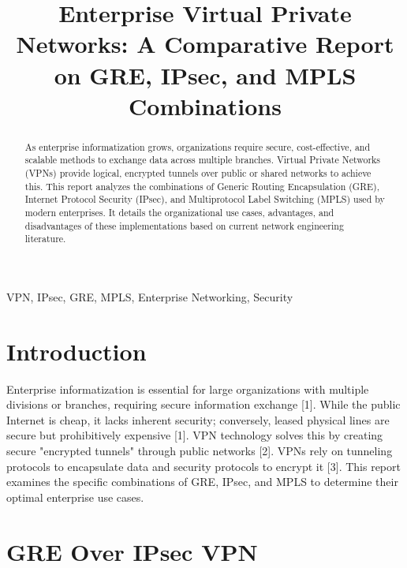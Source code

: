 \documentclass[conference]{IEEEtran}
\begin{document}
\title{Enterprise Virtual Private Networks: A Comparative Report on GRE, IPsec, and MPLS Combinations}

\author{
}

\maketitle

\begin{abstract}
As enterprise informatization grows, organizations require secure, cost-effective, and scalable methods to exchange data across multiple branches. Virtual Private Networks (VPNs) provide logical, encrypted tunnels over public or shared networks to achieve this. This report analyzes the combinations of Generic Routing Encapsulation (GRE), Internet Protocol Security (IPsec), and Multiprotocol Label Switching (MPLS) used by modern enterprises. It details the organizational use cases, advantages, and disadvantages of these implementations based on current network engineering literature.
\end{abstract}

\begin{IEEEkeywords}
VPN, IPsec, GRE, MPLS, Enterprise Networking, Security
\end{IEEEkeywords}

\section{Introduction}
Enterprise informatization is essential for large organizations with multiple divisions or branches, requiring secure information exchange [1]. While the public Internet is cheap, it lacks inherent security; conversely, leased physical lines are secure but prohibitively expensive [1]. VPN technology solves this by creating secure "encrypted tunnels" through public networks [2]. VPNs rely on tunneling protocols to encapsulate data and security protocols to encrypt it [3]. This report examines the specific combinations of GRE, IPsec, and MPLS to determine their optimal enterprise use cases.

\section{GRE Over IPsec VPN}
\end{document}
